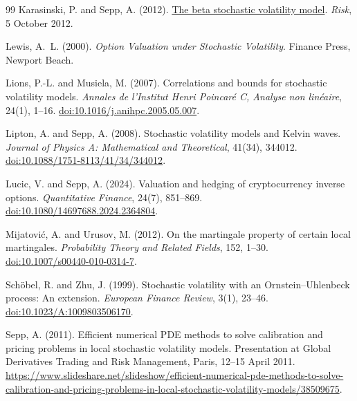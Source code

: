\documentclass[11pt,a4paper]{article}
\theoremstyle{definition}
\theoremstyle{remark}
\begin{document}
\begin{thebibliography}{99}
Karasinski, P. and Sepp, A. (2012).
\href{https://www.risk.net/derivatives/equity-derivatives/2214057/the-beta-stochastic-volatility-model}{The beta stochastic volatility model}.
\emph{Risk}, 5 October 2012.

Lewis, A.~L. (2000).
\emph{Option Valuation under Stochastic Volatility}.
Finance Press, Newport Beach.

Lions, P.-L. and Musiela, M. (2007).
Correlations and bounds for stochastic volatility models.
\emph{Annales de l'Institut Henri Poincar\'e C, Analyse non lin\'eaire},
24(1), 1--16.
\href{https://doi.org/10.1016/j.anihpc.2005.05.007}{doi:10.1016/j.anihpc.2005.05.007}.

Lipton, A. and Sepp, A. (2008).
Stochastic volatility models and Kelvin waves.
\emph{Journal of Physics A: Mathematical and Theoretical}, 41(34), 344012.
\href{https://doi.org/10.1088/1751-8113/41/34/344012}{doi:10.1088/1751-8113/41/34/344012}.

Lucic, V. and Sepp, A. (2024).
Valuation and hedging of cryptocurrency inverse options.
\emph{Quantitative Finance}, 24(7), 851--869.
\href{https://doi.org/10.1080/14697688.2024.2364804}{doi:10.1080/14697688.2024.2364804}.

Mijatovi\'c, A. and Urusov, M. (2012).
On the martingale property of certain local martingales.
\emph{Probability Theory and Related Fields}, 152, 1--30.
\href{https://doi.org/10.1007/s00440-010-0314-7}{doi:10.1007/s00440-010-0314-7}.


Sch\"obel, R. and Zhu, J. (1999).
Stochastic volatility with an Ornstein--Uhlenbeck process: An extension.
\emph{European Finance Review}, 3(1), 23--46.
\href{https://doi.org/10.1023/A:1009803506170}{doi:10.1023/A:1009803506170}.

Sepp, A. (2011).
Efficient numerical PDE methods to solve calibration and pricing problems in local stochastic volatility models.
Presentation at Global Derivatives Trading and Risk Management, Paris, 12--15 April 2011.
{\def\UrlBreaks{\do\/\do\-}\url{https://www.slideshare.net/slideshow/efficient-numerical-pde-methods-to-solve-calibration-and-pricing-problems-in-local-stochastic-volatility-models/38509675}}.


\end{thebibliography}
\end{document}
